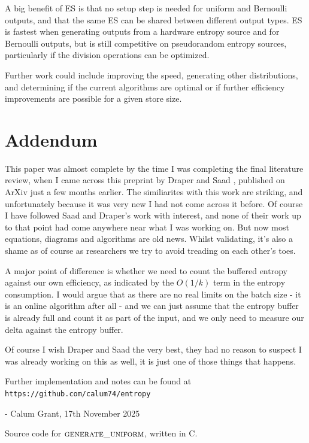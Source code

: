 \documentclass[lettersize,journal]{IEEEtran}
\begin{document}
A big benefit of ES is that no setup step is needed for uniform and Bernoulli outputs, and that the same ES can be shared between different output types. ES is fastest when generating outputs from a hardware entropy source and for Bernoulli outputs, but is still competitive on pseudorandom entropy sources, particularly if the division operations can be optimized.

Further work could include improving the speed, generating other distributions, and determining if the current algorithms are optimal or if further efficiency improvements are possible for a given store size.

\section{Addendum}

This paper was almost complete by the time I was completing the final literature review, when I came across this preprint by Draper and Saad \cite{draper2025efficient2}, published on ArXiv just a few months earlier. The similiarites with this work are striking, and unfortunately because it was very new I had not come across it before. Of course I have followed Saad and Draper's work with interest, and none of their work up to that point had come anywhere near what I was working on. But now most equations, diagrams and algorithms are old news. Whilst validating, it's also a shame as of course as researchers we try to avoid treading on each other's toes.

A major point of difference is whether we need to count the buffered entropy against our own efficiency, as indicated by the $O(1/k)$ term in the entropy consumption. I would argue that as there are no real limits on the batch size - it is an online algorithm after all - and we can just assume that the entropy buffer is already full and count it as part of the input, and we only need to measure our delta against the entropy buffer.

Of course I wish Draper and Saad the very best, they had no reason to suspect I was already working on this as well, it is just one of those things that happens.

Further implementation and notes can be found at
\texttt{https://github.com/calum74/entropy}

- Calum Grant, 17th November 2025

\printbibliography

\appendix

Source code for $\textsc{generate\_uniform}$, written in C.
\end{document}
